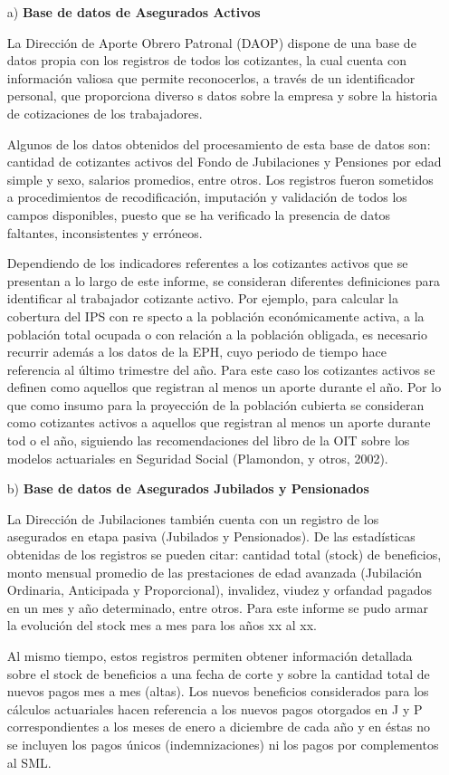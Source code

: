 \begin{enumerate}
    \item[a)] \textbf{Base de datos de Asegurados Activos}
    
 La Dirección de Aporte Obrero Patronal (DAOP) dispone de una base de datos propia con los registros de todos los cotizantes, la cual cuenta con información valiosa que permite reconocerlos, a través de un identificador personal, que proporciona diverso
s datos sobre la empresa y sobre la historia de cotizaciones de los trabajadores. 

Algunos de los datos obtenidos del procesamiento de esta base de datos son: cantidad de cotizantes activos del Fondo de Jubilaciones y Pensiones por edad simple y sexo, salarios promedios, entre otros. Los registros fueron sometidos a procedimientos de 
recodificación, imputación y validación de todos los campos disponibles, puesto que se ha verificado la presencia de datos faltantes, inconsistentes y erróneos. 

Dependiendo de los indicadores referentes a los cotizantes activos que se presentan a lo largo de este informe, se consideran diferentes definiciones para identificar al trabajador cotizante activo. Por ejemplo, para calcular la cobertura del IPS con re
specto a la población económicamente activa, a la población total ocupada o con relación a la población obligada, es necesario recurrir además a los datos de la EPH, cuyo periodo de tiempo hace referencia al último trimestre del año. Para este caso los 
cotizantes activos se definen como aquellos que registran al menos un aporte durante el año. Por lo que como insumo para la proyección de la población cubierta se consideran como cotizantes activos a aquellos que registran al menos un aporte durante tod
o el año, siguiendo las recomendaciones del libro de la OIT sobre los modelos actuariales en Seguridad Social (Plamondon, y otros, 2002).  

 \item[b)] \textbf{Base de datos de Asegurados Jubilados y Pensionados}
         
La Dirección de Jubilaciones también cuenta con un registro de los asegurados en etapa pasiva (Jubilados y Pensionados). De las estadísticas obtenidas de los registros se pueden citar: cantidad total (stock) de beneficios, monto mensual promedio de las 
prestaciones de edad avanzada (Jubilación Ordinaria, Anticipada y Proporcional), invalidez, viudez y orfandad pagados en un mes y año determinado, entre otros. Para este informe se pudo armar la evolución del stock mes a mes para los años xx al xx.

Al mismo tiempo, estos registros permiten obtener información detallada sobre el stock de beneficios a una fecha de corte y sobre la cantidad total de nuevos pagos mes a mes (altas). Los nuevos beneficios considerados para los cálculos actuariales hacen
 referencia a los nuevos pagos otorgados en J y P correspondientes a los meses de enero a diciembre de cada año y en éstas no se incluyen los pagos únicos (indemnizaciones) ni los pagos por complementos al SML.

\end{enumerate}

